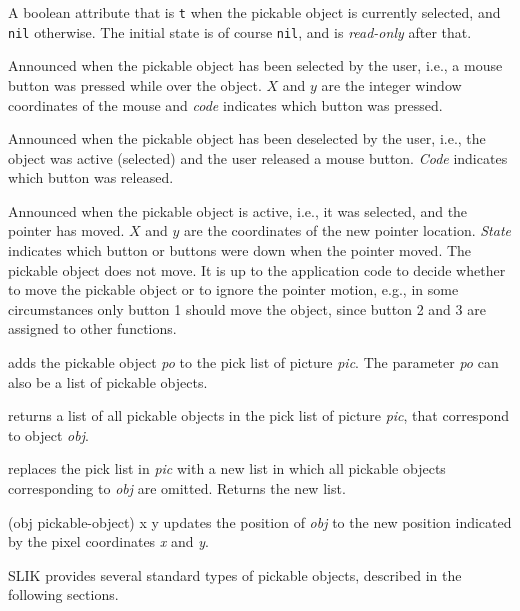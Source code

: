 \documentclass[twoside,openright,11pt]{report}
\newcommand{\tp}[1]{\texttt{#1}}
\begin{document}
{A boolean attribute that is \tp{t} when the pickable object is
currently selected, and \tp{nil} otherwise.  The initial state is
of course \tp{nil}, and is \emph{read-only} after that.}


{Announced when the pickable object has been selected by the user,
i.e., a mouse button was pressed while over the object.  $X$
and $y$ are the integer window coordinates of the mouse and
\emph{code} indicates which button was pressed.}

{Announced when the pickable object has been deselected by the user,
i.e., the object was active (selected) and the user released a mouse
button.  \emph{Code} indicates which button was released.}

{Announced when the pickable object is active, i.e., it was selected,
and the pointer has moved.  $X$ and $y$ are the coordinates of the new
pointer location.  \emph{State} indicates which button or buttons were
down when the pointer moved.  The pickable object does not move.  It
is up to the application code to decide whether to move the pickable
object or to ignore the pointer motion, e.g., in some circumstances
only button 1 should move the object, since button 2 and 3 are
assigned to other functions.}


{adds the pickable object \emph{po} to the pick list of picture
\emph{pic}.  The parameter \emph{po} can also be a list of pickable
objects.}

{returns a list of all pickable objects in the pick list of picture
\emph{pic}, that correspond to object \emph{obj}.}

{replaces the pick list in \emph{pic} with a new list in which all
pickable objects corresponding to \emph{obj} are omitted.  Returns the
new list.}

{(obj pickable-object) x y}
{updates the position of \emph{obj} to the new position indicated by
the pixel coordinates \emph{x} and \emph{y}.}

SLIK provides several standard types of pickable objects, described in
the following sections.
\end{document}
